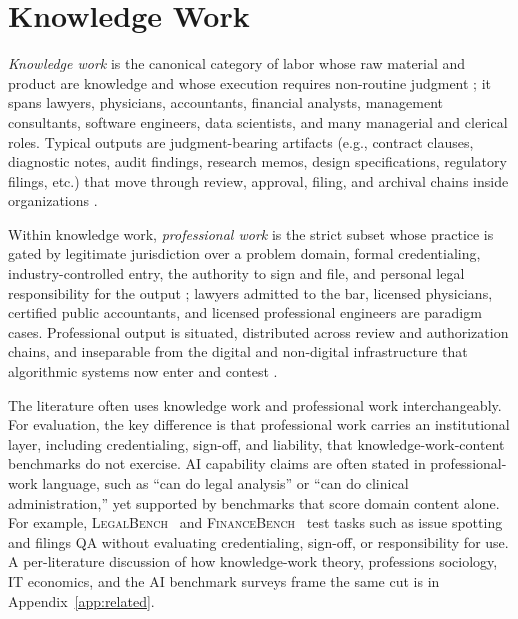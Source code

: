 \documentclass{article}
\begin{document}
\section{Knowledge Work}
\label{sec:related}
\textit{Knowledge work }is the canonical category of labor whose raw material and product are knowledge and whose execution requires non-routine judgment \citep{drucker1959landmarks}; it spans lawyers, physicians, accountants, financial analysts, management consultants, software engineers, data scientists, and many managerial and clerical roles. 
Typical outputs are judgment-bearing artifacts (e.g., contract clauses, diagnostic notes, audit findings, research memos, design specifications, regulatory filings, etc.) that move through review, approval, filing, and archival chains inside organizations \citep{suchman2007humanmachine,kellogg2020algorithms,barley1996technicians}.

Within knowledge work, \textit{professional work} is the strict subset whose practice is gated by legitimate jurisdiction over a problem domain, formal credentialing, industry-controlled entry, the authority to sign and file, and personal legal responsibility for the output \citep{abbott1988system,freidson2001professionalism}; lawyers admitted to the bar, licensed physicians, certified public accountants, and licensed professional engineers are paradigm cases.
Professional output is situated, distributed across review and authorization chains, and inseparable from the digital and non-digital infrastructure that algorithmic systems now enter and contest \citep{barley1996technicians,suchman2007humanmachine,kellogg2020algorithms}.

The literature often uses knowledge work and professional work interchangeably.
For evaluation, the key difference is that professional work carries an institutional layer, including credentialing, sign-off, and liability, that knowledge-work-content benchmarks do not exercise.
AI capability claims are often stated in professional-work language, such as ``can do legal analysis'' or ``can do clinical administration,'' yet supported by benchmarks that score domain content alone.
For example, \textsc{LegalBench}~\citep{legalbench2023} and \textsc{FinanceBench}~\citep{financebench2023} test tasks such as issue spotting and filings QA without evaluating credentialing, sign-off, or responsibility for use.
A per-literature discussion of how knowledge-work theory, professions sociology, IT economics, and the AI benchmark surveys frame the same cut is in Appendix~\ref{app:related}.
\end{document}
